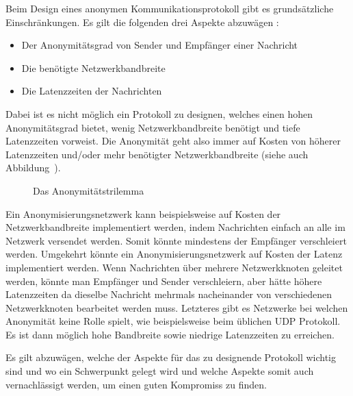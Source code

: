 Beim Design eines anonymen Kommunikationsprotokoll gibt es grundsätzliche Einschränkungen. Es gilt die folgenden drei Aspekte abzuwägen :

\begin{itemize}
    \item Der Anonymitätsgrad von Sender und Empfänger einer Nachricht
    \item Die benötigte Netzwerkbandbreite
    \item Die Latenzzeiten der Nachrichten
\end{itemize}


Dabei ist es nicht möglich ein Protokoll zu designen, welches einen hohen Anonymitätsgrad bietet, wenig Netzwerkbandbreite benötigt und tiefe Latenzzeiten vorweist.
Die Anonymität geht also immer auf Kosten von höherer Latenzzeiten und/oder mehr benötigter Netzwerkbandbreite (siehe auch Abbildung~).

\begin{figure}[H]
    \centering
    \caption{Das Anonymitätstrilemma}\label{fig:anonimitytrilemma}
\end{figure}

Ein Anonymisierungsnetzwerk kann beispielsweise auf Kosten der Netzwerkbandbreite implementiert werden, indem Nachrichten einfach an alle im Netzwerk versendet werden. Somit könnte mindestens der Empfänger verschleiert werden.
Umgekehrt könnte ein Anonymisierungsnetzwerk auf Kosten der Latenz implementiert werden. Wenn Nachrichten über mehrere Netzwerkknoten geleitet werden, könnte man Empfänger und Sender verschleiern, aber hätte höhere Latenzzeiten da dieselbe Nachricht mehrmals nacheinander von verschiedenen Netzwerkknoten bearbeitet werden muss.
Letzteres gibt es Netzwerke bei welchen Anonymität keine Rolle spielt, wie beispielsweise beim üblichen UDP Protokoll. Es ist dann möglich hohe Bandbreite sowie niedrige Latenzzeiten zu erreichen.

Es gilt abzuwägen, welche der Aspekte für das zu designende Protokoll wichtig sind und wo ein Schwerpunkt gelegt wird und welche Aspekte somit auch vernachlässigt werden, um einen guten Kompromiss zu finden. \parencite{das_anonymity_2018}

